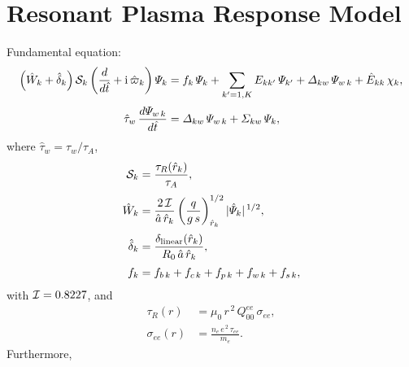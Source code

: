 \documentclass[notitlepage,12pt]{article}
\begin{document}
\section{Resonant Plasma Response Model}
Fundamental equation:
\begin{align}\label{e1}
\left(\hat{W}_k +\hat{\delta}_k\right){\cal S}_k\left(\frac{d}{d\hat{t}} + {\rm i}\,\hat{\varpi}_k\right){\mit\Psi}_k& =f_k\,{\mit\Psi}_k
+\sum_{k'=1,K}E_{kk'}\,{\mit\Psi}_{k'}+
{\mit\Delta}_{kw}\,{\mit\Psi}_{w\,k}+ \hat{E}_{kk}\,\chi_k,\\[0.5ex]
\hat{\tau}_w\,\frac{d{\mit\Psi}_{w\,k}}{d\hat{t}}&= {\mit\Delta}_{kw}\,{\mit\Psi}_{w\,k} +{\mit\Sigma}_{kw}\,{\mit\Psi}_k,\label{e2d}
\end{align}
where $\hat{\tau}_w = \tau_w/\tau_A$, 
\begin{align}
{\cal S}_k&=\frac{\tau_R(\hat{r}_k)}{\tau_A},\\[0.5ex]
\hat{W}_k &=\frac{2\,{\cal I}}{\hat{a}\,\hat{r}_k}\left(\frac{q}{g\,s}\right)_{\hat{r}_k}^{1/2} |\hat{\mit\Psi}_k|^{\,1/2},\\[0.5ex]
\hat{\delta}_k &= \frac{\delta_{\rm linear}(\hat{r}_k)}{R_0\,\hat{a}\,\hat{r}_k},\\[0.5ex]
f_k&=f_{b\,k}+f_{c\,k}+f_{p\,k}+f_{w\,k}+f_{s\,k},
\end{align}
with ${\cal I}=0.8227$, and
\begin{align}
\tau_R(r) &= \mu_0\,r^{\,2}\,Q_{00}^{ee}\,\sigma_{ee},\\[0.5ex]
\sigma_{ee}(r) &=\frac{n_e\,e^{\,2}\,\tau_{ee}}{m_e}.
\end{align}
Furthermore,
\end{document}
